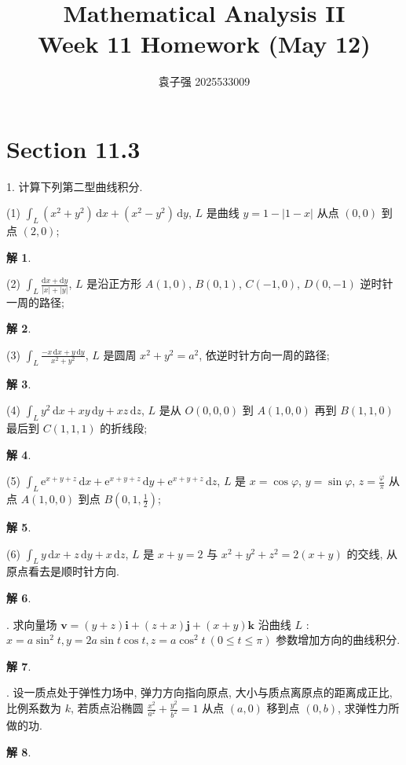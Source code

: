 \documentclass[a4paper,12pt]{article}
\title{Mathematical Analysis II\\Week 11 Homework (May 12)}
\author{袁子强\hspace{1cm} 2025533009}
\theoremstyle{definition}
\newtheorem*{sol}{解}
\begin{document}
\maketitle

\section*{Section 11.3}

1. 计算下列第二型曲线积分.

(1) $\displaystyle\int_L (x^2 + y^2)\,\mathrm{d}x + (x^2 - y^2)\,\mathrm{d}y$, $L$ 是曲线 $y = 1 - |1 - x|$ 从点 $(0,0)$ 到点 $(2,0)$;
\begin{sol}

\end{sol}
\newpage
(2) $\displaystyle\int_L \frac{\mathrm{d}x + \mathrm{d}y}{|x| + |y|}$, $L$ 是沿正方形 $A(1,0)$, $B(0,1)$, $C(-1,0)$, $D(0,-1)$ 逆时针一周的路径;
\begin{sol}

\end{sol}
\newpage
(3) $\displaystyle\int_L \frac{-x\,\mathrm{d}x + y\,\mathrm{d}y}{x^2 + y^2}$, $L$ 是圆周 $x^2 + y^2 = a^2$, 依逆时针方向一周的路径;
\begin{sol}

\end{sol}
\newpage
(4) $\displaystyle\int_L y^2\,\mathrm{d}x + xy\,\mathrm{d}y + xz\,\mathrm{d}z$, $L$ 是从 $O(0,0,0)$ 到 $A(1,0,0)$ 再到 $B(1,1,0)$ 最后到 $C(1,1,1)$ 的折线段;
\begin{sol}

\end{sol}
\newpage
(5) $\displaystyle\int_L \mathrm{e}^{x+y+z}\,\mathrm{d}x + \mathrm{e}^{x+y+z}\,\mathrm{d}y + \mathrm{e}^{x+y+z}\,\mathrm{d}z$, $L$ 是 $x = \cos\varphi$, $y = \sin\varphi$, $z = \frac{\varphi}{\pi}$ 从点 $A(1,0,0)$ 到点 $B(0,1,\frac{1}{2})$;
\begin{sol}

\end{sol}
\newpage
(6) $\displaystyle\int_L y\,\mathrm{d}x + z\,\mathrm{d}y + x\,\mathrm{d}z$, $L$ 是 $x + y = 2$ 与 $x^2 + y^2 + z^2 = 2(x + y)$ 的交线, 从原点看去是顺时针方向.
\begin{sol}

\end{sol}
. 求向量场 $\boldsymbol{v} = (y + z)\boldsymbol{i} + (z + x)\boldsymbol{j} + (x + y)\boldsymbol{k}$ 沿曲线 $L$ : $x = a\sin^2 t, y = 2a\sin t\cos t, z = a\cos^2 t\ (0 \leqslant t \leqslant \pi)$ 参数增加方向的曲线积分.
\begin{sol}

\end{sol}
. 设一质点处于弹性力场中, 弹力方向指向原点, 大小与质点离原点的距离成正比, 比例系数为 $k$, 若质点沿椭圆 $\frac{x^2}{a^2} + \frac{y^2}{b^2} = 1$ 从点 $(a, 0)$ 移到点 $(0, b)$, 求弹性力所做的功.
\begin{sol}

\end{sol}
\newpage
\end{document}
